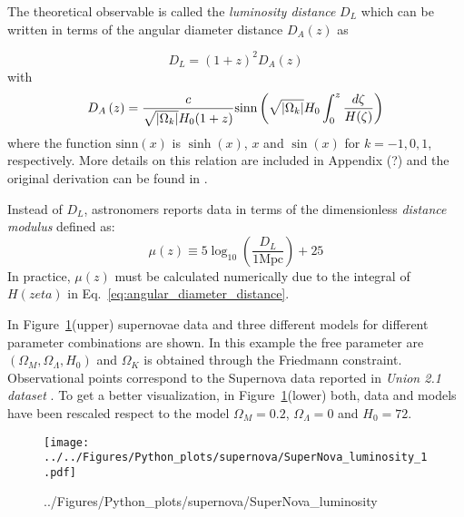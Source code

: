 \documentclass[12pt,letterpaper,twoside]{book}
\newcommand\etcomment[1]{\MakeUppercase{\mytexttt{\textcolor{blue}{#1}}}}
\DeclarePairedDelimiter\abs{\lvert}{\rvert}%
\begin{document}
\etcomment{It is necessary to include the mu-derivation here?}The theoretical
observable is called the \textit{luminosity distance} $D_L$ which can be written
in terms of the angular diameter distance $D_A(z)$ as

\begin{equation}
    \label{eq:luminosity_distance}
   D_L =  \left( 1 + z \right)^2 D_A \left( z \right)
\end{equation}
%
with
%
\begin{equation}
    \label{eq:angular_diameter_distance}
    D_A \left( z \right) = \frac{c}{\sqrt{\abs{\Omega_k}}H_0(1+z)}
    \mbox{sinn} \left( \sqrt{\abs{\Omega_k}} H_0 \int_0^z
        \frac{d\zeta}{H(\zeta)} \right)
\end{equation}
%
where the function $\mbox{sinn}(x)$ is $\sinh(x)$, $x$ and $\sin(x)$ for
$k=-1,0,1$, respectively.  More details on this relation are included in
Appendix (?) and the original derivation can be found in \cite{Carroll:1991mt}.

Instead of $D_L$, astronomers reports data in terms of the dimensionless
\textit{distance modulus} defined as:
%
\begin{equation}
    \label{eq:distance_moduli}
    \mu  \left( z \right) \equiv 5 \log_{10}
                          \left( \frac{D_L}{1\mbox{Mpc}} \right) + 25
\end{equation}
%
In practice, $\mu(z)$ must be calculated numerically due to the integral of
$H(zeta)$ in Eq.~\eqref{eq:angular_diameter_distance}.

In Figure~\ref{fig:SuperNova_luminosity}(upper) supernovae data and three
different models for different parameter combinations are shown. In this example
the free parameter are $\left(\Omega_M, \Omega_\Lambda, H_0\right)$ and
$\Omega_K$ is obtained through the Friedmann constraint. Observational points
correspond to the Supernova data reported in \textit{Union 2.1 dataset}
\cite{0004-637X-746-1-85}. To get a better visualization, in
Figure~\ref{fig:SuperNova_luminosity}(lower) both, data and models have been
rescaled respect to the model $\Omega_M =0.2$, $\Omega_\Lambda=0$ and $H_0=72$.

\begin{figure}[tb]
    \centering
    \texttt{[image: ../../Figures/Python\_plots/supernova/SuperNova\_luminosity\_1.pdf]}
    \caption{../Figures/Python\_plots/supernova/SuperNova\_luminosity}
    \label{fig:SuperNova_luminosity}
\end{figure}
\end{document}
